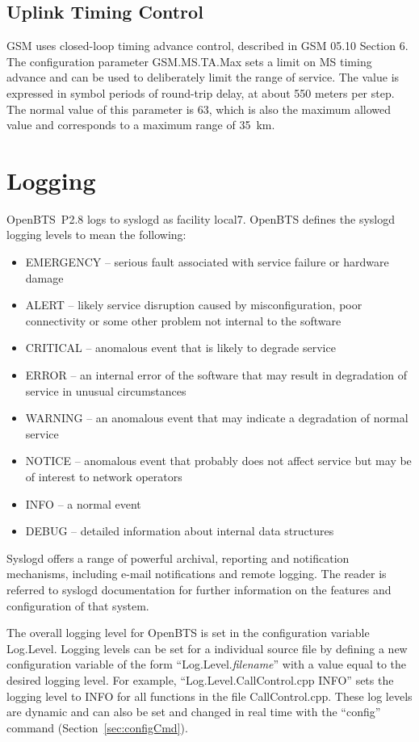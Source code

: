 \documentclass[11pt,openany]{book}
\begin{document}
\subsection{Uplink Timing Control}
GSM uses closed-loop timing advance control, described in GSM 05.10 Section 6.
The configuration parameter GSM.MS.TA.Max sets a limit on MS timing advance and can be used to deliberately limit the range of service. The value is expressed in symbol periods of round-trip delay, at about 550 meters per step. The normal value of this parameter is 63, which is also the maximum allowed value and corresponds to a maximum range of 35~km.


\section{Logging}
\label{sec:Logging}
OpenBTS~P2.8 logs to syslogd as facility local7.
OpenBTS defines the syslogd logging levels to mean the following:
\begin{itemize}
	\item EMERGENCY -- serious fault associated with service failure or hardware damage
	\item ALERT -- likely service disruption caused by misconfiguration, poor connectivity or some other problem not internal to the software
	\item CRITICAL -- anomalous event that is likely to degrade service
	\item ERROR -- an internal error of the software that may result in degradation of service in unusual circumstances
	\item WARNING -- an anomalous event that may indicate a degradation of normal service
	\item NOTICE -- anomalous event that probably does not affect service but may be of interest to network operators
	\item INFO -- a normal event
	\item DEBUG -- detailed information about internal data structures
\end{itemize}

Syslogd offers a range of powerful archival, reporting and notification mechanisms, including e-mail notifications and remote logging.  The reader is referred to syslogd documentation for further information on the features and configuration of that system.

The overall logging level for OpenBTS is set in the configuration variable Log.Level.  Logging levels can be set for a individual source file by defining a new configuration variable of the form ``Log.Level.\emph{filename}'' with a value equal to the desired logging level.  For example, ``Log.Level.CallControl.cpp INFO'' sets the logging level to INFO for all functions in the file CallControl.cpp.  These log levels are dynamic and can also be set and changed in real time with the ``config'' command (Section~\ref{sec:configCmd}).
\end{document}

